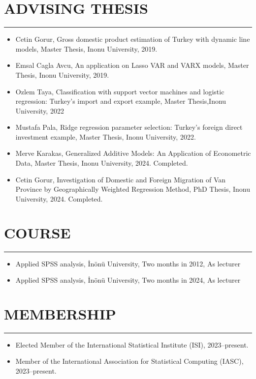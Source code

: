 \documentclass[10pt,letterpaper]{article}
\newcommand{\NewPart}[2]{%
	\Needspace{7\baselineskip}%
	\vspace{0.45em}%
	\section*{\sffamily\large\bfseries\color{MidnightBlue}\uppercase{#1} #2}%
	\vspace{-0.7em}\noindent\color{MidnightBlue}\rule{\textwidth}{0.55pt}\color{Black}\vspace{0.25em}}
\begin{document}


\NewPart{Advising Thesis}{}
\begin{itemize}


\item Cetin Gorur, Gross domestic product estimation of Turkey with dynamic line models, Master Thesis, Inonu University, 2019.
\item Emsal Cagla Avcu, An application on Lasso VAR and VARX models, Master Thesis, Inonu University, 2019.
\item Ozlem Taya, Classification with support vector machines and logistic regression: Turkey's import and export example, Master Thesis,Inonu University, 2022
\item Mustafa Pala, Ridge regression parameter selection: Turkey's foreign direct investment example, Master Thesis, Inonu University, 2022.
\item Merve Karakas, Generalized Additive Models: An Application of Econometric Data, Master Thesis, Inonu University, 2024. Completed.
\item Cetin Gorur, Investigation of Domestic and Foreign Migration of Van Province by Geographically Weighted Regression Method, PhD Thesis, Inonu University, 2024. Completed.




\end{itemize}


\NewPart{Course}{}

\begin{itemize}
\item Applied SPSS analysis, \.{I}n\"{o}n\"{u} University, Two months in 2012, As lecturer
\item Applied SPSS analysis, \.{I}n\"{o}n\"{u} University, Two months in 2024, As lecturer
\end{itemize}

\NewPart{Membership}{}

\begin{itemize}

\item Elected Member of the International Statistical Institute (ISI), 2023--present.
\item Member of the International Association for Statistical Computing (IASC), 2023--present.

\end{itemize}
\end{document}
